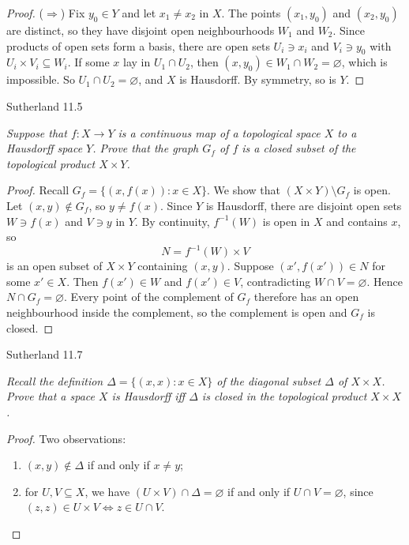 \documentclass[minion]{homework}
\begin{document}
\begin{problems}
\begin{proof}
($\Rightarrow$) Fix $y_0 \in Y$ and let $x_1 \ne x_2$ in $X$. The points $(x_1, y_0)$ and $(x_2, y_0)$ are distinct, so they have disjoint open neighbourhoods $W_1$ and $W_2$. Since products of open sets form a basis, there are open sets $U_i \ni x_i$ and $V_i \ni y_0$ with $U_i \times V_i \subseteq W_i$. If some $x$ lay in $U_1 \cap U_2$, then $(x, y_0) \in W_1 \cap W_2 = \varnothing$, which is impossible. So $U_1 \cap U_2 = \varnothing$, and $X$ is Hausdorff. By symmetry, so is $Y$.
\end{proof}
\problem Sutherland 11.5

\textit{Suppose that $f \colon X \to Y$ is a continuous map of a topological space $X$ to a Hausdorff space $Y$. Prove that the graph $G_f$ of $f$ is a closed subset of the topological product $X \times Y$.}

\begin{proof}
Recall $G_f = \{(x, f(x)) : x \in X\}$. We show that $(X \times Y) \setminus G_f$ is open. Let $(x, y) \notin G_f$, so $y \neq f(x)$. Since $Y$ is Hausdorff, there are disjoint open sets $W \ni f(x)$ and $V \ni y$ in $Y$. By continuity, $f^{-1}(W)$ is open in $X$ and contains $x$, so
\[
N = f^{-1}(W) \times V
\]
is an open subset of $X \times Y$ containing $(x, y)$. Suppose $(x', f(x')) \in N$ for some $x' \in X$. Then $f(x') \in W$ and $f(x') \in V$, contradicting $W \cap V = \varnothing$. Hence $N \cap G_f = \varnothing$. Every point of the complement of $G_f$ therefore has an open neighbourhood inside the complement, so the complement is open and $G_f$ is closed.
\end{proof}

\problem Sutherland 11.7

\textit{Recall the definition $\Delta = \{(x, x) : x \in X\}$ of the diagonal subset $\Delta$ of $X \times X$. Prove that a space $X$ is Hausdorff iff $\Delta$ is closed in the topological product $X \times X$.}

\begin{proof}
Two observations:
\begin{enumerate}
  \item $(x, y) \notin \Delta$ if and only if $x \neq y$;
  \item for $U, V \subseteq X$, we have $(U \times V) \cap \Delta = \varnothing$ if and only if $U \cap V = \varnothing$, since $(z, z) \in U \times V \iff z \in U \cap V$.
\end{enumerate}


\end{proof}
\end{problems}
\end{document}
